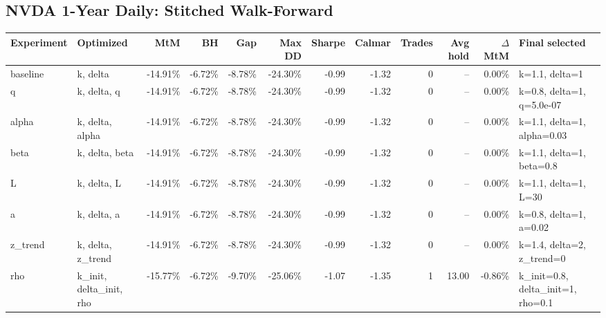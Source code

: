 \documentclass[10pt]{article}
\begin{document}
\subsection*{NVDA 1-Year Daily: Stitched Walk-Forward}
\scriptsize
\setlength{\tabcolsep}{3pt}
\begin{tabular}{p{0.85in}p{0.95in}rrrrrrrrrp{1.15in}}
\toprule
Experiment & Optimized & MtM & BH & Gap & Max DD & Sharpe & Calmar & Trades & Avg hold & $\Delta$ MtM & Final selected \\
\midrule
baseline & k, delta & -14.91\% & -6.72\% & -8.78\% & -24.30\% & -0.99 & -1.32 & 0 & -- & 0.00\% & k=1.1, delta=1 \\
q & k, delta, q & -14.91\% & -6.72\% & -8.78\% & -24.30\% & -0.99 & -1.32 & 0 & -- & 0.00\% & k=0.8, delta=1, q=5.0e-07 \\
alpha & k, delta, alpha & -14.91\% & -6.72\% & -8.78\% & -24.30\% & -0.99 & -1.32 & 0 & -- & 0.00\% & k=1.1, delta=1, alpha=0.03 \\
beta & k, delta, beta & -14.91\% & -6.72\% & -8.78\% & -24.30\% & -0.99 & -1.32 & 0 & -- & 0.00\% & k=1.1, delta=1, beta=0.8 \\
L & k, delta, L & -14.91\% & -6.72\% & -8.78\% & -24.30\% & -0.99 & -1.32 & 0 & -- & 0.00\% & k=1.1, delta=1, L=30 \\
a & k, delta, a & -14.91\% & -6.72\% & -8.78\% & -24.30\% & -0.99 & -1.32 & 0 & -- & 0.00\% & k=0.8, delta=1, a=0.02 \\
z\_trend & k, delta, z\_trend & -14.91\% & -6.72\% & -8.78\% & -24.30\% & -0.99 & -1.32 & 0 & -- & 0.00\% & k=1.4, delta=2, z\_trend=0 \\
rho & k\_init, delta\_init, rho & -15.77\% & -6.72\% & -9.70\% & -25.06\% & -1.07 & -1.35 & 1 & 13.00 & -0.86\% & k\_init=0.8, delta\_init=1, rho=0.1 \\
\bottomrule
\end{tabular}
\normalsize
\end{document}
